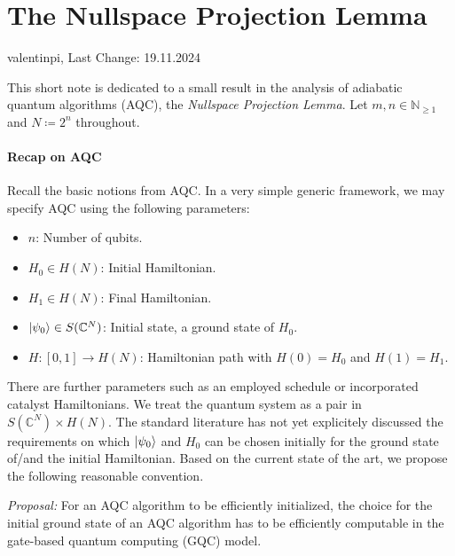 \documentclass[10pt]{amsart}
\theoremstyle{definition}
\theoremstyle{remark}
\begin{document}
    \section*{The Nullspace Projection Lemma} \hfill \hfill valentinpi, Last Change: 19.11.2024

    This short note is dedicated to a small result in the analysis of adiabatic quantum algorithms (AQC), the \emph{Nullspace Projection Lemma}. Let \(m, n \in \mathbb{N}_{\geq 1}\) and \(N \coloneqq 2^n\) throughout.
    
    \phantom{}

    \paragraph*{\textbf{Recap on AQC}} Recall the basic notions from AQC. In a very simple generic framework, we may specify AQC using the following parameters:
    \begin{itemize}
        \item \(n\): Number of qubits.
        \item \(H_0 \in H(N)\): Initial Hamiltonian.
        \item \(H_1 \in H(N)\): Final Hamiltonian.
        \item \(\ket{\psi_0} \in S(\mathbb{C}^N)\): Initial state, a ground state of \(H_0\).
        \item \(H\colon [0, 1] \to H(N)\): Hamiltonian path with \(H(0) = H_0\) and \(H(1) = H_1\).
    \end{itemize}
    There are further parameters such as an employed schedule or incorporated catalyst Hamiltonians. We treat the quantum system as a pair in \(S(\mathbb{C}^N) \times H(N)\). The standard literature has not yet explicitely discussed the requirements on which \(\ket{\psi_0}\) and \(H_0\) can be chosen initially for the ground state of/and the initial Hamiltonian. Based on the current state of the art, we propose the following reasonable convention.

    \phantom{}

    \emph{Proposal:} For an AQC algorithm to be efficiently initialized, the choice for the initial ground state of an AQC algorithm has to be efficiently computable in the gate-based quantum computing (GQC) model.

    \phantom{}
\end{document}
